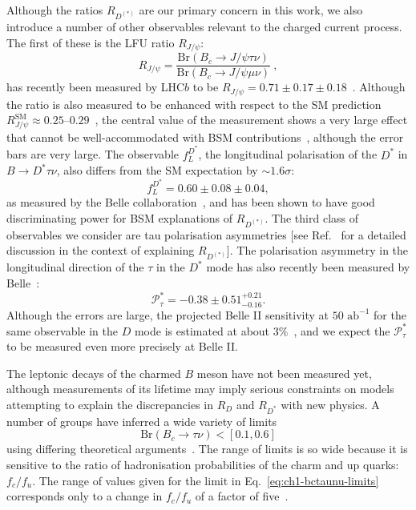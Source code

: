 Although the ratios $R_{D^{(*)}}$ are our primary concern in this work, we also
introduce a number of other observables relevant to the charged current process.
The first of these is the LFU ratio $R_{J/\psi}$:
\begin{equation}
  \label{eq:ch1-rjpsi}
  R_{J/\psi} = \frac{\mathrm{Br}(B_{c} \to J/\psi \tau \nu)}{\mathrm{Br}(B_{c} \to J/\psi \mu \nu)} \ ,
\end{equation}
has recently been measured by LHC$b$ to be
$R_{J/\psi} = 0.71 \pm 0.17 \pm 0.18$~\cite{Aaij:2017tyk}. Although the ratio is
also measured to be enhanced with respect to the SM prediction
$R_{J/\psi}^{\text{SM}} \approx 0.25$--$0.29$~\cite{Anisimov:1998uk,
  Kiselev:2002vz, Ivanov:2006ni, Hernandez:2006gt, Huang:2007kb, Wang:2008xt,
  Issadykov:2018myx, Wen-Fei:2013uea, Alok:2017qsi, Azatov:2018knx, Hu:2019qcn,
  Leljak:2019eyw, Azizi:2019aaf}, the central value of the measurement shows a
very large effect that cannot be well-accommodated with BSM
contributions~\cite{Murgui:2019czp}, although the error bars are very large. The
observable $f_L^{D^*}$, the longitudinal polarisation of the $D^*$ in
$B \to D^* \tau \nu$, also differs from the SM expectation by $\sim 1.6 \sigma$:
\begin{equation}
    f_L^{D^*} = 0.60 \pm 0.08 \pm 0.04,
\end{equation}
as measured by the Belle collaboration~\cite{Abdesselam:2019wbt}, and has been
shown to have good discriminating power for BSM explanations of $R_{D^{(*)}}$.
The third class of observables we consider are tau polarisation asymmetries [see
Ref.~\cite{Asadi:2018sym} for a detailed discussion in the context of explaining
$R_{D^{(*)}}$]. The polarisation asymmetry in the longitudinal direction of the
$\tau$ in the $D^*$ mode has also recently been measured by
Belle~\cite{Hirose:2016wfn}:
\begin{equation}
\mathcal{P}_{\tau}^{*} = -0.38 \pm 0.51^{+0.21}_{-0.16} .
\end{equation}
Although the errors are large, the projected Belle II sensitivity at
$50 \text{ ab}^{-1}$ for the same observable in the $D$ mode is estimated at
about $3\%$~\cite{Alonso:2017ktd}, and we expect the $\mathcal{P}_\tau^{*}$ to
be measured even more precisely at Belle II.

The leptonic decays of the charmed $B$ meson have not been measured yet,
although measurements of its lifetime may imply serious constraints on models
attempting to explain the discrepancies in $R_{D}$ and $R_{D^{*}}$ with new
physics. A number of groups have inferred a wide variety of limits
\begin{equation}
  \label{eq:ch1-bctaunu-limits}
 \mathrm{Br}(B_{c} \to \tau \nu) < [0.1, 0.6]
\end{equation}
using differing theoretical arguments~\cite{Li:2016vvp, Akeroyd:2017mhr,
  Alonso:2016oyd, Blanke:2018yud, Bardhan:2019ljo}. The range of limits is so
wide because it is sensitive to the ratio of hadronisation probabilities of the
charm and up quarks: $f_{c}/f_{u}$. The range of values given for the limit in
Eq.~\eqref{eq:ch1-bctaunu-limits} corresponds only to a change in $f_{c}/f_{u}$ of a
factor of five~\cite{Bardhan:2019ljo}.

